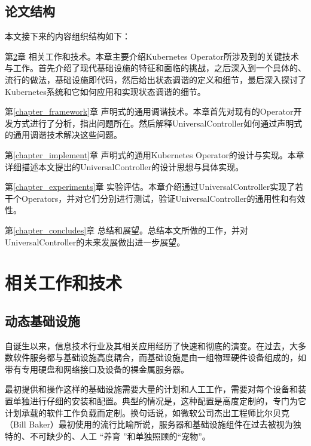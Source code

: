 \documentclass[macfonts,master]{njuthesis}
\begin{document}
\section{论文结构}
本文接下来的内容组织结构如下：


第\ref{chapter_relative}章 相关工作和技术。本章主要介绍Kubernetes Operator所涉及到的关键技术与工作。首先介绍了现代基础设施的特征和面临的挑战，之后深入到一个具体的、流行的做法，基础设施即代码，然后给出状态调谐的定义和细节，最后深入探讨了Kubernetes系统和它如何应用和实现状态调谐的细节。

第\ref{chapter_framework}章 声明式的通用调谐技术。本章首先对现有的Operator开发方式进行了分析，指出问题所在。然后解释UniversalController如何通过声明式的通用调谐技术解决这些问题。

第\ref{chapter_implement}章 声明式的通用Kubernetes Operator的设计与实现。本章详细描述本文提出的UniversalController的设计思想与具体实现。

第\ref{chapter_experiments}章 实验评估。本章介绍通过UniversalController实现了若干个Operators，并对它们分别进行测试，验证UniversalController的通用性和有效性。

第\ref{chapter_concludes}章 总结和展望。总结本文所做的工作，并对UniversalController的未来发展做出进一步展望。
\chapter{相关工作和技术}\label{chapter_relative}
\section{动态基础设施}

自诞生以来，信息技术行业及其相关应用经历了快速和彻底的演变。在过去，大多数软件服务都与基础设施高度耦合，而基础设施是由一组物理硬件设备组成的，如带有专用硬盘和网络接口及设备的裸金属服务器。

最初提供和操作这样的基础设施需要大量的计划和人工工作，需要对每个设备和装置单独进行仔细的安装和配置。典型的情况是，这种配置是高度定制的，专门为它计划承载的软件工作负载而定制\cite{morris2016infrastructure}。换句话说，如微软公司杰出工程师比尔贝克（Bill Baker）最初使用的流行比喻\cite{scalingsqlserver}所说，服务器和基础设施组件在过去被视为独特的、不可缺少的、人工 ``养育 ''和单独照顾的``宠物''。
\end{document}
